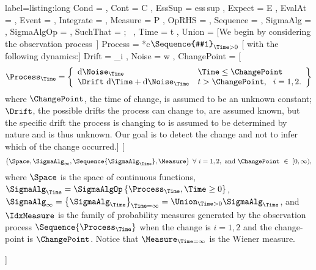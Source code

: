 \documentclass{article} %
\begin{document}
\begin{listing}[Long]
  {label=listing:long}
  \Ccool
  {
    Cond = { \mid },
    Cont = { C },
    EssSup = { \textrm{ess\,sup} },
    Expect = { E },
    EvalAt = ,
    Event = \CcoolLambda{\left\{#1\right\}},
    Integrate = ,
    Measure = { P },
    OpRHS = \CcoolLambda{\left[#1\right]},
    Sequence = \CcoolLambda{\left\{#1\right\}},
    SigmaAlg = {  },
    SigmaAlgOp = { \operatorname{\sigma} },
    SuchThat = { ;~ },
    Time = { t },
    Union = { \cup }                                                      
  }
  [We begin by considering the observation process~]
  { Process = { \xi } }*c{$\Sequence{#1}_{\Time>0}$} 
  [ with the following dynamics:]
  {
    Drift = { \mu_i },
    Noise = { w },
    ChangePoint = { \tau }
  }
  [\begin{displaymath}
    \Process_{\Time} = \left\{
      \begin{array}{ll}
        \dif\Noise_{\Time}  & \Time \le \ChangePoint \\
        \Drift\, \dif\Time + \dif\Noise_{\Time} &  t > \ChangePoint,~~i=1,2.
      \end{array}\right\}
  \end{displaymath}where $\ChangePoint$, the time of change, is assumed to be an unknown constant; $\Drift$, the possible drifts the process can change to, are assumed known, but the specific drift the process is changing to is assumed to be determined by nature and is thus unknown. Our goal is to detect the change and not to infer which of the change occurred.]{}
  \Ccool[The probability triple is~]
  {
    Space = { \Cont{[}0,\infty{)} },
    IdxMeasure = { \Measure^i_{\ChangePoint} }
  }
  [\begin{equation*}
    \left(\Space, \SigmaAlg_{\infty}, \Sequence{\SigmaAlg_{\Time}}, \Measure\right)~\forall~i=1,2,~\rm{and}~\ChangePoint~\in~{[}0,\infty{)},
  \end{equation*}where $\Space$ is the space of continuous functions,
  $\SigmaAlg_{\Time} = \SigmaAlgOp\left\{\Process_{\Time}, \Time \ge 0\right\}$, $\SigmaAlg_{\infty} = \left\{\SigmaAlg_{\Time}\right\}_{\Time=\infty} = \Union_{\Time>0} \SigmaAlg_{\Time}$, and $\IdxMeasure$ is the family of probability measures generated by the observation process $\Sequence{\Process_{\Time}}$ when the change is $i=1,2$ and the change-point is $\ChangePoint$. Notice that $\Measure_{\Time=\infty}$ is the Wiener measure.\par]{}


\end{listing}
\end{document}
